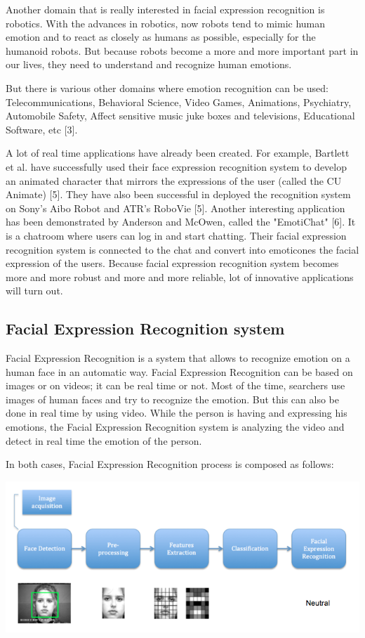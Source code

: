 Another domain that is really interested in facial expression recognition is robotics. With the advances in robotics, now robots tend to mimic human emotion and to react as closely as humans as possible, especially for the humanoid robots. But because robots become a more and more important part in our lives, they need to understand and recognize human emotions.

But there is various other domains where emotion recognition can be used: Telecommunications, Behavioral Science, Video Games, Animations, Psychiatry, Automobile Safety, Affect sensitive music juke boxes and televisions, Educational Software, etc [3].

A lot of real time applications have already been created. For example, Bartlett et al. have successfully used their face expression recognition system to develop an animated character that mirrors the expressions of the user (called the CU Animate) [5]. They have also been successful in deployed the recognition system on Sony's Aibo Robot and ATR's RoboVie [5]. Another interesting application has been demonstrated by Anderson and McOwen, called the "EmotiChat" [6]. It is a chatroom where users can log in and start chatting. Their facial expression recognition system is connected to the chat and convert into emoticones the facial expression of the users. Because facial expression recognition system becomes more and more robust and more and more reliable, lot of innovative applications will turn out.

\subsection{Facial Expression Recognition system}

Facial Expression Recognition is a system that allows to recognize emotion on a human face in an automatic way. Facial Expression Recognition can be based on images or on videos; it can be real time or not. Most of the time, searchers use images of human faces and try to recognize the emotion. But this can also be done in real time by using video. While the person is having and expressing his emotions, the Facial Expression Recognition system is analyzing the video and detect in real time the emotion of the person.

In both cases, Facial Expression Recognition process is composed as follows:


\noindent \includegraphics[scale=0.6]{figures/facial_expression_recognition_process}


